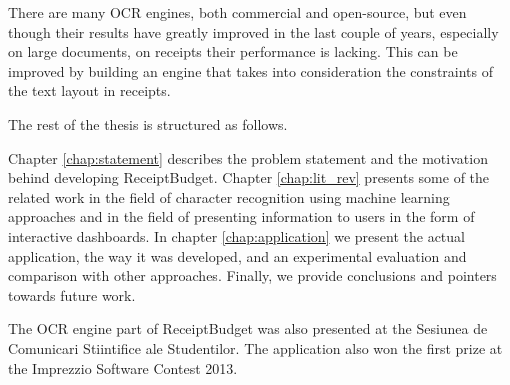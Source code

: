 There are many OCR engines, both commercial and open-source, but even though their results have greatly improved in the last couple of years, especially on large documents, on receipts their performance is lacking. This can be improved by building an engine that takes into consideration the constraints of the text layout in receipts. 

The rest of the thesis is structured as follows.

Chapter \ref{chap:statement} describes the problem statement and the motivation behind developing ReceiptBudget. Chapter \ref{chap:lit_rev} presents some of the related work in the field of character recognition using machine learning approaches and in the field of presenting information to users in the form of interactive dashboards. In chapter \ref{chap:application} we present the actual application, the way it was developed, and an experimental evaluation and comparison with other approaches. Finally, we provide conclusions and pointers towards future work. 

The OCR engine part of ReceiptBudget was also presented at the Sesiunea de Comunicari Stiintifice ale Studentilor. The application also won the first prize at the Imprezzio Software Contest 2013. 